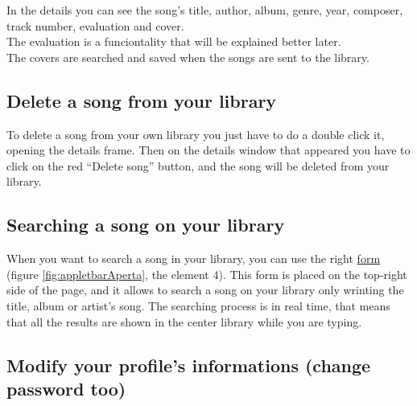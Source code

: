 In the details you can see the song's title, author, album, genre, year,
composer, track number, evaluation and cover.\\
The evaluation is a funciontality that will be explained better later.\\
The covers are searched and saved when the songs are sent to the library.

\subsection{Delete a song from your library}

To delete a song from your own library you just have to do a double click it, opening 
the details frame. Then on the details window that appeared you have to
click on the red ``Delete song'' button, and the song will be deleted from your
library.

\subsection{Searching a song on your library}

When you want to search a song in your library, you can use the right
\underline{form} (figure \ref{fig:appletbarAperta}, the element 4). This form is
placed on the top-right side of the page, and it allows to search a song on your
library only wrinting the title, album or artist's song. The searching process
is in real time, that means that all the results are shown in the center
library while you are typing.

\subsection{Modify your profile's informations (change password too)}

